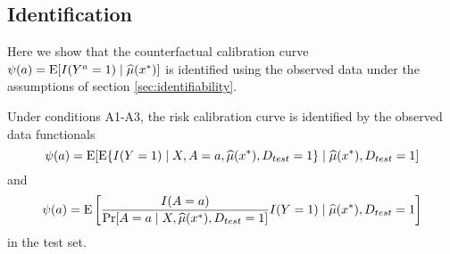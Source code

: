 \subsection{Identification}
Here we show that the counterfactual calibration curve $\psi(a) = \operatorname{E}[I(Y^a = 1) \mid \widehat{\mu}(x^*)]$ is identified using the observed data under the assumptions of section \ref{sec:identifiability}.
\begin{theorem}
     Under conditions A1-A3, the risk calibration curve is identified by the observed data functionals
\begin{equation}\label{eqn:cl_calib_estimand}
    \psi(a) = \operatorname{E}[\operatorname{E}\{I(Y = 1) \mid X, A = a, \widehat{\mu}(x^*), D_{test} = 1\}\mid \widehat{\mu}(x^*), D_{test} = 1]
\end{equation}
and 
\begin{equation}\label{eqn:ipw_calib_estimand}
    \psi(a) = \operatorname{E}\left[\frac{I(A = a)}{\Pr[A = a \mid X, \widehat{\mu}(x^*), D_{test} = 1]} I(Y=1) \mid \widehat{\mu}(x^*), D_{test} = 1\right]
\end{equation}
in the test set. 

\end{theorem}

